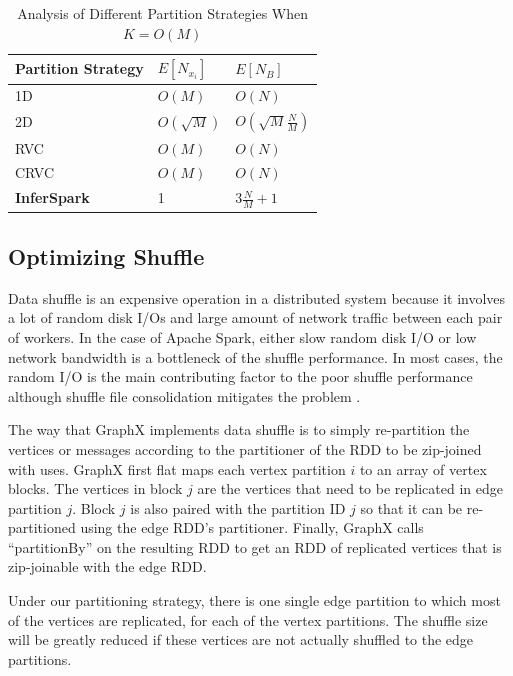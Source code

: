 \begin{table}[h]
	\centering
	\caption{Analysis of Different Partition Strategies When $K = O(M)$}
	\label{tab:max_v_per_edge_part_OM}
	\small
	\begin{tabular}{lll}
		\hline
		Partition Strategy & $E[N_{x_i}]$ & $E[N_B]$\\\hline\hline
		1D & $O(M)$ & $O(N)$ \\\hline
		2D & $O(\sqrt{M})$ & $O(\sqrt{M}\frac{N}{M})$ \\\hline
		RVC & $O(M)$ & $O(N)$ \\\hline
		CRVC & $O(M)$ & $O(N)$ \\\hline
		{\bf InferSpark} & 1 & $3\frac{N}{M}+1$ \\\hline
	\end{tabular}
\end{table}

\subsection{Optimizing Shuffle}
\label{sec:optimize_shuffle}

Data shuffle is an expensive operation in a distributed system because it
involves a lot of random disk I/Os and large amount of network traffic between each
pair of workers. In the case of Apache Spark, either slow random disk I/O or
low network bandwidth is a bottleneck of the shuffle performance. In most
cases, the random I/O is the main contributing factor to the poor shuffle
performance although shuffle file consolidation mitigates the problem
\cite{spark-shuffle}.

The way that GraphX implements data shuffle is to simply re-partition the
vertices or messages according to the partitioner of the RDD to be zip-joined
with uses. GraphX first flat maps each vertex partition $i$ to an array of
vertex blocks. The vertices in block $j$ are the vertices that need to be
replicated in edge partition $j$.  Block $j$ is also paired with the partition
ID $j$ so that it can be re-partitioned using the edge RDD's partitioner.
Finally, GraphX calls ``partitionBy'' on the resulting RDD to get an RDD of
replicated vertices that is zip-joinable with the edge RDD.

Under our partitioning strategy, there is one single edge partition to which
most of the vertices are replicated, for each of the vertex partitions. The
shuffle size will be greatly reduced if these vertices are not actually
shuffled to the edge partitions.

